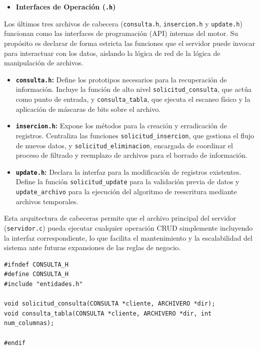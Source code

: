 \documentclass[12pt]{article}
\begin{document}
\begin{itemize}
    \item \textbf{Interfaces de Operación (\texttt{.h})}
\end{itemize}

Los últimos tres archivos de cabecera (\texttt{consulta.h}, \texttt{insercion.h} y \texttt{update.h}) funcionan como las interfaces de programación (API) internas del motor. Su propósito es declarar de forma estricta las funciones que el servidor puede invocar para interactuar con los datos, aislando la lógica de red de la lógica de manipulación de archivos.

\begin{itemize}
    \item \textbf{\texttt{consulta.h}:} Define los prototipos necesarios para la recuperación de información. Incluye la función de alto nivel \texttt{solicitud\_consulta}, que actúa como punto de entrada, y \texttt{consulta\_tabla}, que ejecuta el escaneo físico y la aplicación de máscaras de bits sobre el archivo.
    \item \textbf{\texttt{insercion.h}:} Expone los métodos para la creación y erradicación de registros. Centraliza las funciones \texttt{solicitud\_insercion}, que gestiona el flujo de nuevos datos, y \texttt{solicitud\_eliminacion}, encargada de coordinar el proceso de filtrado y reemplazo de archivos para el borrado de información.
    \item \textbf{\texttt{update.h}:} Declara la interfaz para la modificación de registros existentes. Define la función \texttt{solicitud\_update} para la validación previa de datos y \texttt{update\_archivo} para la ejecución del algoritmo de reescritura mediante archivos temporales.
\end{itemize}

Esta arquitectura de cabeceras permite que el archivo principal del servidor (\texttt{servidor.c}) pueda ejecutar cualquier operación CRUD simplemente incluyendo la interfaz correspondiente, lo que facilita el mantenimiento y la escalabilidad del sistema ante futuras expansiones de las reglas de negocio.

\begin{lstlisting}[style=estiloC ,title={Código 2. Servidor TCP (consulta.h)}]
#ifndef CONSULTA_H 
#define CONSULTA_H
#include "entidades.h"

void solicitud_consulta(CONSULTA *cliente, ARCHIVERO *dir);
void consulta_tabla(CONSULTA *cliente, ARCHIVERO *dir, int num_columnas);

#endif
\end{lstlisting}
\end{document}
